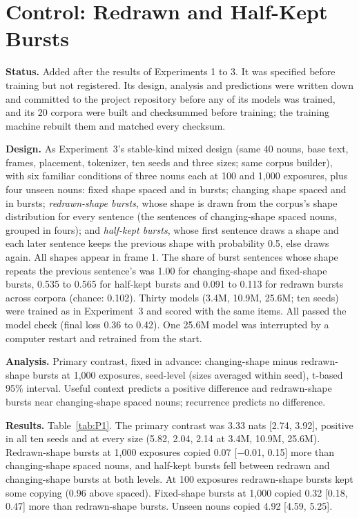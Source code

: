 \FloatBarrier
\section{Control: Redrawn and Half-Kept Bursts}\label{app:P}
\setcounter{table}{0}
\textbf{Status.} Added after the results of Experiments 1 to 3. It was specified before training but not registered. Its design, analysis and predictions were written down and committed to the project repository before any of its models was trained, and its 20 corpora were built and checksummed before training; the training machine rebuilt them and matched every checksum.

\textbf{Design.} As Experiment~3's stable-kind mixed design (same 40 nouns, base text, frames, placement, tokenizer, ten seeds and three sizes; same corpus builder), with six familiar conditions of three nouns each at 100 and 1,000 exposures, plus four unseen nouns: fixed shape spaced and in bursts; changing shape spaced and in bursts; \emph{redrawn-shape bursts}, whose shape is drawn from the corpus's shape distribution for every sentence (the sentences of changing-shape spaced nouns, grouped in fours); and \emph{half-kept bursts}, whose first sentence draws a shape and each later sentence keeps the previous shape with probability 0.5, else draws again. All shapes appear in frame 1. The share of burst sentences whose shape repeats the previous sentence's was 1.00 for changing-shape and fixed-shape bursts, 0.535 to 0.565 for half-kept bursts and 0.091 to 0.113 for redrawn bursts across corpora (chance: 0.102). Thirty models (3.4M, 10.9M, 25.6M; ten seeds) were trained as in Experiment~3 and scored with the same items. All passed the model check (final loss 0.36 to 0.42). One 25.6M model was interrupted by a computer restart and retrained from the start.

\textbf{Analysis.} Primary contrast, fixed in advance: changing-shape minus redrawn-shape bursts at 1,000 exposures, seed-level (sizes averaged within seed), t-based 95\% interval. Useful context predicts a positive difference and redrawn-shape bursts near changing-shape spaced nouns; recurrence predicts no difference.

\textbf{Results.} Table~\ref{tab:P1}. The primary contrast was 3.33 nats [2.74, 3.92], positive in all ten seeds and at every size (5.82, 2.04, 2.14 at 3.4M, 10.9M, 25.6M). Redrawn-shape bursts at 1,000 exposures copied 0.07 [$-$0.01, 0.15] more than changing-shape spaced nouns, and half-kept bursts fell between redrawn and changing-shape bursts at both levels. At 100 exposures redrawn-shape bursts kept some copying (0.96 above spaced). Fixed-shape bursts at 1,000 copied 0.32 [0.18, 0.47] more than redrawn-shape bursts. Unseen nouns copied 4.92 [4.59, 5.25].

